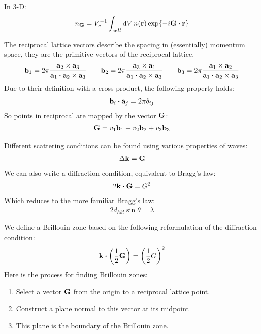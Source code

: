 \documentclass[12pt]{article}
\begin{document}
In 3-D:
\begin{align*}
  n_{\vb{G}}=V_c^{-1}\int_{cell}\dd{V}n(\vb{r})\exp{-i\vb{G}\vdot\vb{r}}
\end{align*}

The reciprocal lattice vectors describe the spacing in (essentially) momentum space, they are the primitive vectors of the reciprocal lattice. 
\begin{align*}
  \vb{b}_1=2\pi\frac{\vb{a}_2\times\vb{a}_3}
  {\vb{a}_1\vdot\vb{a}_2\times\vb{a}_3}\qquad
  \vb{b}_2=2\pi\frac{\vb{a}_3\times\vb{a}_1}
  {\vb{a}_1\vdot\vb{a}_2\times\vb{a}_3}\qquad
  \vb{b}_3=2\pi\frac{\vb{a}_1\times\vb{a}_2}
  {\vb{a}_1\vdot\vb{a}_2\times\vb{a}_3}
\end{align*}
Due to their definition with a cross product, the following property holds:
\begin{align*}
  \vb{b}_i\vdot\vb{a}_j=2\pi\delta_{ij}
\end{align*}
So points in reciprocal are mapped by the vector $\vb{G}$:
\begin{align*}
  \vb{G}=v_1\vb{b}_1+v_2\vb{b}_2+v_3\vb{b}_3
\end{align*}

Different scattering conditions can be found using various properties of waves:
\begin{align*}
  \Delta{\vb{k}}=\vb{G}
\end{align*}
We can also write a diffraction condition, equivalent to Bragg's law:
\begin{align*}
  2\vb{k}\vdot\vb{G}=G^2
\end{align*}
Which reduces to the more familiar Bragg's law:
\begin{align*}
  2d_{hkl}\sin\theta=\lambda
\end{align*}

We define a Brillouin zone based on the following reformulation of the diffraction condition:
\begin{align*}
  \vb{k}\vdot\qty(\frac{1}{2}\vb{G})=\qty(\frac{1}{2}G)^2
\end{align*}
Here is the process for finding Brillouin zones:
\begin{enumerate}
\item Select a vector $\vb{G}$ from the origin to a reciprocal lattice point.
\item Construct a plane normal to this vector at its midpoint
\item This plane is the boundary of the Brillouin zone.
\end{enumerate}
\end{document}

